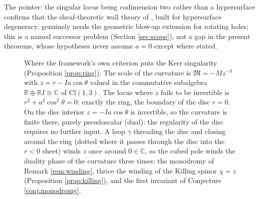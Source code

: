 \documentclass[11pt]{article}
\theoremstyle{definition}
\newcommand{\Cl}{\mathrm{Cl}}
\newcommand{\R}{\mathbb{R}}
\newcommand{\C}{\mathbb{C}}
\begin{document}
The pointer: the singular locus being codimension two rather than a hypersurface confirms that the sheaf-theoretic wall theory of \cite{ButlerT4}, built for hypersurface degeneracy, genuinely needs the geometric blow-up extension for rotating holes; this is a named successor problem (Section \ref{sec:scope}), not a gap in the present theorems, whose hypotheses never assume $a = 0$ except where stated.

\begin{figure}[t]
\centering
{}
\caption{Where the framework's own criterion puts the Kerr singularity (Proposition \ref{prop:ring}). The scale of the curvature is $\mathfrak M = -M z^{-3}$ with $z = r - Ia\cos\theta$ valued in the commutative subalgebra $\R \oplus \R I \cong \C$ of $\Cl(1,3)$. The locus where $z$ fails to be invertible is $r^2 + a^2\cos^2\theta = 0$: exactly the ring, the boundary of the disc $r = 0$. On the disc interior $z = -Ia\cos\theta$ is invertible, so the curvature is finite there, purely pseudoscalar (dual): the regularity of the disc requires no further input. A loop $\gamma$ threading the disc and closing around the ring (dotted where it passes through the disc into the $r < 0$ sheet) winds $z$ once around $0 \in \C$, so the cubed pole winds the duality phase of the curvature three times: the monodromy of Remark \ref{rem:winding}, thrice the winding of the Killing spinor $\chi = z$ (Proposition \ref{prop:killing}), and the first invariant of Conjecture \ref{conj:monodromy}.}
\label{fig:ring}
\end{figure}
\end{document}
